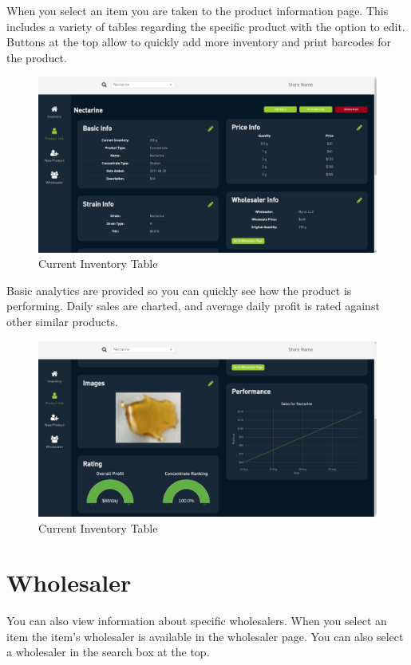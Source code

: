 \documentclass[]{book}
\theoremstyle{definition}
\theoremstyle{definition}
\theoremstyle{definition}
\theoremstyle{remark}
\begin{document}
When you select an item you are taken to the product information page.
This includes a variety of tables regarding the specific product with
the option to edit. Buttons at the top allow to quickly add more
inventory and print barcodes for the product.

\begin{figure}
\centering
\includegraphics{images/I5.png}
\caption{Current Inventory Table}
\end{figure}

Basic analytics are provided so you can quickly see how the product is
performing. Daily sales are charted, and average daily profit is rated
against other similar products.

\begin{figure}
\centering
\includegraphics{images/I6.png}
\caption{Current Inventory Table}
\end{figure}

\section{Wholesaler}\label{wholesaler}

You can also view information about specific wholesalers. When you
select an item the item's wholesaler is available in the wholesaler
page. You can also select a wholesaler in the search box at the top.
\end{document}

